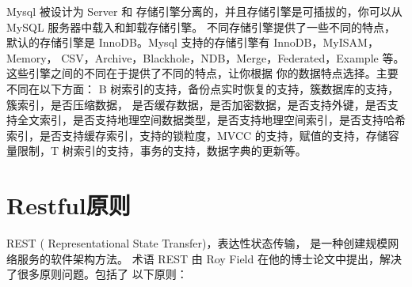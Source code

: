 Mysql 被设计为 Server 和 存储引擎分离的，并且存储引擎是可插拔的，你可以从 MySQL 服务器中载入和卸载存储引擎。
不同存储引擎提供了一些不同的特点，默认的存储引擎是 InnoDB。Mysql 支持的存储引擎有 InnoDB，MyISAM，Memory，
CSV，Archive，Blackhole，NDB，Merge，Federated，Example 等。这些引擎之间的不同在于提供了不同的特点，让你根据
你的数据特点选择。主要不同在以下方面： B 树索引的支持，备份点实时恢复的支持，簇数据库的支持，簇索引，是否压缩数据，
是否缓存数据，是否加密数据，是否支持外键，是否支持全文索引，是否支持地理空间数据类型，是否支持地理空间索引，是否支持哈希
索引，是否支持缓存索引，支持的锁粒度，MVCC 的支持，赋值的支持，存储容量限制，T 树索引的支持，事务的支持，数据字典的更新等\cite{MysqlNewFeature}。

\section{Restful原则}
REST ( Representational State Transfer)，表达性状态传输， 是一种创建规模网络服务的软件架构方法。
术语 REST 由 Roy Field 在他的博士论文中提出，解决了很多原则问题。包括了
以下原则\cite{RESTfulService}：

